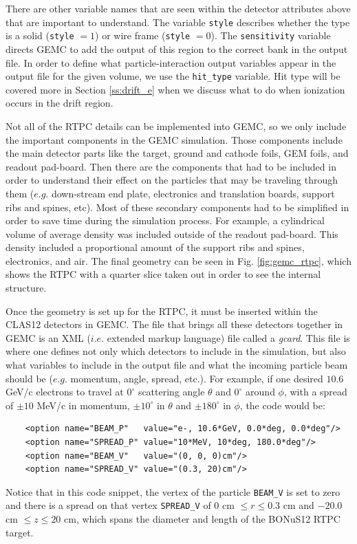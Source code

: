 There are other variable names that are seen within the detector attributes above that are important to understand. The variable \lstinline|style| describes whether the type is a solid (\lstinline|style| $= 1$) or wire frame (\lstinline|style| $= 0$). The \lstinline|sensitivity| variable directs GEMC to add the output of this region to the correct bank in the output file. In order to define what particle-interaction output variables appear in the output file for the given volume, we use the \lstinline|hit_type| variable. Hit type will be covered more in Section \ref{ss:drift_e} when we discuss what to do when ionization occurs in the drift region.

Not all of the RTPC details can be implemented into GEMC, so we only include the important components in the GEMC simulation. Those components include the main detector parts like the target, ground and cathode foils, GEM foils, and readout pad-board. Then there are the components that had to be included in order to understand their effect on the particles that may be traveling through them ($e.g.$ down-stream end plate, electronics and translation boards, support ribs and spines, etc). Most of these secondary components had to be simplified in order to save time during the simulation process. For example, a cylindrical volume of average density was included outside of the readout pad-board. This density included a proportional amount of the support ribs and spines, electronics, and air. The final geometry can be seen in Fig. \ref{fig:gemc_rtpc}, which shows the RTPC with a quarter slice taken out in order to see the internal structure. 

Once the geometry is set up for the RTPC, it must be inserted within the CLAS12 detectors in GEMC. The file that brings all these detectors together in GEMC is an XML ($i.e.$ extended markup language) file called a \textit{gcard}. This file is where one defines not only which detectors to include in the simulation, but also what variables to include in the output file and what the incoming particle beam should be ($e.g.$ momentum, angle, spread, etc.). For example, if one desired $10.6$ GeV/c electrons to travel at $0^{\circ}$ scattering angle $\theta$ and $0^{\circ}$ around $\phi$, with a spread of $\pm 10$ MeV/c in momentum, $\pm 10^{\circ}$ in $\theta$ and $\pm 180^{\circ}$ in $\phi$, the code would be:

\begin{lstlisting}
	<option name="BEAM_P"   value="e-, 10.6*GeV, 0.0*deg, 0.0*deg"/> 
	<option name="SPREAD_P" value="10*MeV, 10*deg, 180.0*deg"/>
	<option name="BEAM_V"   value="(0, 0, 0)cm"/>
	<option name="SPREAD_V" value="(0.3, 20)cm"/>
\end{lstlisting}
Notice that in this code snippet, the vertex of the particle \lstinline|BEAM_V| is set to zero and there is a spread on that vertex \lstinline|SPREAD_V| of $0$ cm $\leq r \leq 0.3$ cm and $-20.0$ cm $\leq z \leq 20$ cm, which spans the diameter and length of the BONuS12 RTPC target.

